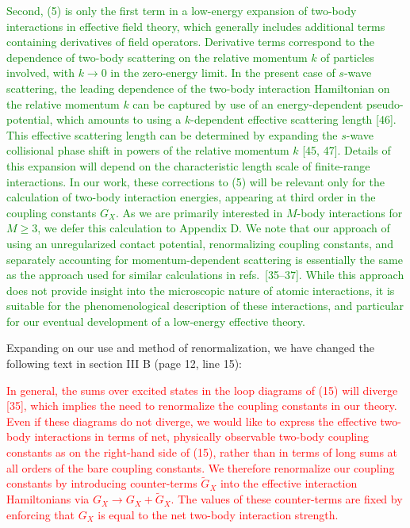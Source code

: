 \documentclass[preprint]{revtex4-1}
\newcommand{\1}{\mathds{1}}
\newcommand{\red}[1]{\textcolor{red}{#1}}
\newcommand{\green}[1]{\textcolor{green}{#1}}
\begin{document}
\begin{enumerate}
  \green{Second, (5) is only the first term in a low-energy expansion
    of two-body interactions in effective field theory, which
    generally includes additional terms containing derivatives of
    field operators.  Derivative terms correspond to the dependence of
    two-body scattering on the relative momentum $k$ of particles
    involved, with $k\to0$ in the zero-energy limit.  In the present
    case of $s$-wave scattering, the leading dependence of the
    two-body interaction Hamiltonian on the relative momentum $k$ can
    be captured by use of an energy-dependent pseudo-potential, which
    amounts to using a $k$-dependent effective scattering length [46].
    This effective scattering length can be determined by expanding
    the $s$-wave collisional phase shift in powers of the relative
    momentum $k$ [45, 47].  Details of this expansion will depend on
    the characteristic length scale of finite-range interactions.  In
    our work, these corrections to (5) will be relevant only for the
    calculation of two-body interaction energies, appearing at third
    order in the coupling constants $G_X$.  As we are primarily
    interested in $M$-body interactions for $M\ge3$, we defer this
    calculation to Appendix D.  We note that our approach of using an
    unregularized contact potential, renormalizing coupling constants,
    and separately accounting for momentum-dependent scattering is
    essentially the same as the approach used for similar calculations
    in refs.~[35--37].  While this approach does not provide insight
    into the microscopic nature of atomic interactions, it is suitable
    for the phenomenological description of these interactions, and
    particular for our eventual development of a low-energy effective
    theory.}

  Expanding on our use and method of renormalization, we have changed
  the following text in section III B (page 12, line 15):

  \red{In general, the sums over excited states in the loop diagrams
    of (15) will diverge [35], which implies the need to renormalize
    the coupling constants in our theory.  Even if these diagrams do
    not diverge, we would like to express the effective two-body
    interactions in terms of net, physically observable two-body
    coupling constants as on the right-hand side of (15), rather than
    in terms of long sums at all orders of the bare coupling
    constants.  We therefore renormalize our coupling constants by
    introducing counter-terms $\tilde G_X$ into the effective
    interaction Hamiltonians via $G_X\to G_X+\tilde G_X$.  The values
    of these counter-terms are fixed by enforcing that $G_X$ is equal
    to the net two-body interaction strength.}


\end{enumerate}
\end{document}
